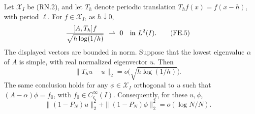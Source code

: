 \begin{lemma}
\label{AC-S40-translation}
Let \(\mathcal X_I\) be (RN.2), and let \(T_h\) denote periodic
translation \(T_hf(x)=f(x-h)\), with period \(\ell\).
For \(f\in\mathcal X_I\), as \(h\downarrow0\),
\[
 \frac{[A,T_h]f}{\sqrt{h\log(1/h)}}\ \rightharpoonup\ 0
                         \quad\hbox{in }L^2(I).           \tag{FE.5}
\]
The displayed vectors are bounded in norm.
Suppose that the lowest eigenvalue \(\alpha\) of \(A\) is simple,
with real normalized eigenvector \(u\).  Then
\[
             \|T_hu-u\|_2=o\bigl(\sqrt{h\log(1/h)}\bigr).
                                                        \tag{FE.6}
\]
The same conclusion holds for any \(\phi\in\mathcal X_I\)
orthogonal to \(u\) such that
\((A-\alpha)\phi=f_0\), with \(f_0\in C_c^\infty(I)\).
Consequently, for these \(u,\phi\),
\[
 \|(1-P_N)u\|_2^2+\|(1-P_N)\phi\|_2^2
                         =o(\log N/N).                   \tag{FE.7}
\]
\end{lemma}
